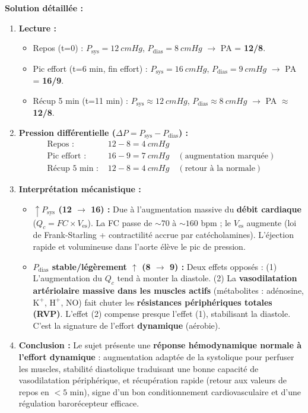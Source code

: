\documentclass[11pt]{article}
\begin{document}
\begin{exoresolu}
\textbf{Solution détaillée :}
\begin{enumerate}
    \item \textbf{Lecture :}
    \begin{itemize}
        \item Repos (t=0) : $P_{\text{sys}} = \SI{12}{cmHg}$, $P_{\text{dias}} = \SI{8}{cmHg}$ $\rightarrow$ PA = \textbf{12/8}.
        \item Pic effort (t=6 min, fin effort) : $P_{\text{sys}} = \SI{16}{cmHg}$, $P_{\text{dias}} = \SI{9}{cmHg}$ $\rightarrow$ PA = \textbf{16/9}.
        \item Récup 5 min (t=11 min) : $P_{\text{sys}} \approx \SI{12}{cmHg}$, $P_{\text{dias}} \approx \SI{8}{cmHg}$ $\rightarrow$ PA $\approx$ \textbf{12/8}.
    \end{itemize}
    \item \textbf{Pression différentielle ($\Delta P = P_{\text{sys}} - P_{\text{dias}}$) :}
    \begin{align*}
        \text{Repos : } & 12 - 8 = \SI{4}{cmHg} \\
        \text{Pic effort : } & 16 - 9 = \SI{7}{cmHg} \quad (\text{augmentation marquée}) \\
        \text{Récup 5 min : } & 12 - 8 = \SI{4}{cmHg} \quad (\text{retour à la normale})
    \end{align*}
    \item \textbf{Interprétation mécanistique :}
    \begin{itemize}
        \item \textbf{$\uparrow P_{\text{sys}}$ (12 $\rightarrow$ 16) :} Due à l'augmentation massive du \textbf{débit cardiaque} ($Q_c = FC \times V_{\text{es}}$). La FC passe de $\sim 70$ à $\sim 160$ \si{bpm} ; le $V_{\text{es}}$ augmente (loi de Frank-Starling + contractilité accrue par catécholamines). L'éjection rapide et volumineuse dans l'aorte élève le pic de pression.
        \item \textbf{$P_{\text{dias}}$ stable/légèrement $\uparrow$ (8 $\rightarrow$ 9) :} Deux effets opposés : (1) L'augmentation du $Q_c$ tend à monter la diastole. (2) La \textbf{vasodilatation artériolaire massive dans les muscles actifs} (métabolites : adénosine, $\text{K}^+$, $\text{H}^+$, NO) fait chuter les \textbf{résistances périphériques totales (RVP)}. L'effet (2) compense presque l'effet (1), stabilisant la diastole. C'est la signature de l'effort \textbf{dynamique} (aérobie).
    \end{itemize}
    \item \textbf{Conclusion :} Le sujet présente une \textbf{réponse hémodynamique normale à l'effort dynamique} : augmentation adaptée de la systolique pour perfuser les muscles, stabilité diastolique traduisant une bonne capacité de vasodilatation périphérique, et récupération rapide (retour aux valeurs de repos en $< 5$ min), signe d'un bon conditionnement cardiovasculaire et d'une régulation barorécepteur efficace.
\end{enumerate}
\end{exoresolu}
\end{document}
